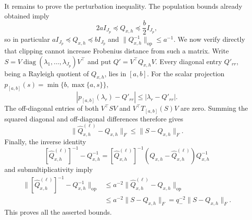 It remains to prove the perturbation inequality. The population bounds already obtained imply
\[
 2aI_{J_p}\preceq Q_{x,h}\preceq \frac b2 I_{J_p},
\]
so in particular \(aI_{J_p}\preceq Q_{x,h}\preceq bI_{J_p}\) and \(\|Q_{x,h}^{-1}\|_{\mathrm{op}}\le a^{-1}\). We now verify directly that clipping cannot increase Frobenius distance from such a matrix. Write \(S=V\operatorname{diag}(\lambda_1,\ldots,\lambda_{J_p})V^\top\) and put \(Q'=V^\top Q_{x,h}V\). Every diagonal entry \(Q'_{rr}\), being a Rayleigh quotient of \(Q_{x,h}\), lies in \([a,b]\). For the scalar projection \(p_{[a,b]}(s)=\min\{b,\max\{a,s\}\}\),
\[
 |p_{[a,b]}(\lambda_r)-Q'_{rr}|
 \le |\lambda_r-Q'_{rr}|.
\]
The off-diagonal entries of both \(V^\top SV\) and \(V^\top T_{[a,b]}(S)V\) are zero. Summing the squared diagonal and off-diagonal differences therefore gives
\[
 \|\widehat Q^{(\ell)}_{x,h}-Q_{x,h}\|_F
 \le \|S-Q_{x,h}\|_F.
\]
Finally, the inverse identity
\[
 [\widehat Q^{(\ell)}_{x,h}]^{-1}-Q_{x,h}^{-1}
 = [\widehat Q^{(\ell)}_{x,h}]^{-1}
 (Q_{x,h}-\widehat Q^{(\ell)}_{x,h})Q_{x,h}^{-1}
\]
and submultiplicativity imply
\[
\begin{aligned}
 \|[\widehat Q^{(\ell)}_{x,h}]^{-1}-Q_{x,h}^{-1}\|_{\mathrm{op}}
 &\le a^{-2}\|\widehat Q^{(\ell)}_{x,h}-Q_{x,h}\|_{\mathrm{op}}\\
 &\le a^{-2}\|S-Q_{x,h}\|_F
 =q_-^{-2}\|S-Q_{x,h}\|_F.
\end{aligned}
\]
This proves all the asserted bounds.